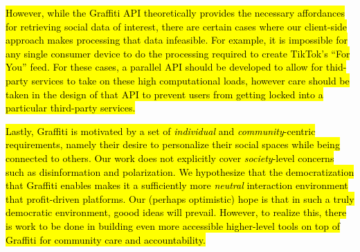 {\hl{%
However, while the Graffiti API theoretically provides the necessary
affordances for retrieving social data of interest,
there are certain cases where our client-side
approach makes processing that data infeasible.
For example, it is impossible for any single consumer device to
do the processing required to create TikTok's ``For You'' feed.
For these cases, a parallel API should be developed to allow for thid-party
services to take on these high computational loads, however care should be taken
in the design of that API to prevent users from getting locked into a
particular third-party services.
}}%

{\hl{%
Lastly, Graffiti is motivated by a set of \emph{individual} and \emph{community}-centric requirements,
namely their desire to personalize their social spaces while being connected to others.
Our work does not explicitly cover \emph{society}-level concerns
such as disinformation and polarization.
We hypothesize that the democratization that Graffiti enables
makes it a sufficiently more \emph{neutral} interaction environment that
profit-driven platforms.
Our (perhaps optimistic) hope is that in such a truly democratic environment, goood ideas will prevail.
However, to realize this, there is work to be done in building even more
accessible higher-level tools on top of Graffiti for community care and accountability.
}}%











